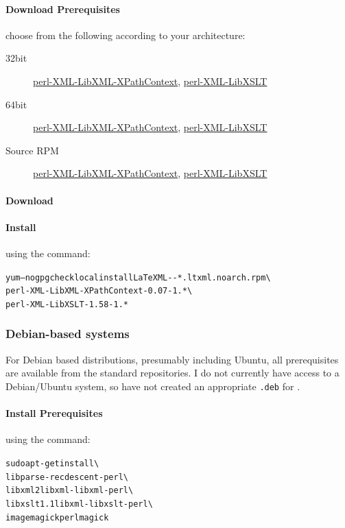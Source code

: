 \documentclass{article}
\begin{document}
\paragraph{Download Prerequisites} choose from the following according to your architecture:
\begin{description}
\item[32bit]
   \href{releases/perl-XML-LibXML-XPathContext-0.07-1.c5.ltxml.i386.rpm}{perl-XML-LibXML-XPathContext},
   \href{releases/perl-XML-LibXSLT-1.58-1.c5.ltxml.i386.rpm}{perl-XML-LibXSLT}
\item[64bit]
   \href{releases/perl-XML-LibXML-XPathContext-0.07-1.c5.ltxml.x86_64.rpm}{perl-XML-LibXML-XPathContext},
   \href{releases/perl-XML-LibXSLT-1.58-1.c5.ltxml.x86_64.rpm}{perl-XML-LibXSLT}
\item[Source RPM]
    \href{releases/perl-XML-LibXML-XPathContext-0.07-1.c5.ltxml.src.rpm}{perl-XML-LibXML-XPathContext},
    \href{releases/perl-XML-LibXSLT-1.58-1.c5.ltxml.src.rpm}{perl-XML-LibXSLT}
\end{description}
\paragraph{Download} \CurrentCentos
\paragraph{Install} using the command:
\begin{alltt}
   yum --nogpgcheck localinstall LaTeXML-\CurrentVersion-*.ltxml.noarch.rpm \textbackslash\\
       perl-XML-LibXML-XPathContext-0.07-1.*   \textbackslash\\
       perl-XML-LibXSLT-1.58-1.*
\end{alltt}

\subsubsection{Debian-based systems}\label{install.debian}
For Debian based distributions, presumably including Ubuntu,
all prerequisites are available from the standard repositories.
I do not currently have access to a Debian/Ubuntu system, so
have not created an appropriate \texttt{.deb} for \LaTeXML.
\paragraph{Install Prerequisites} using the command:
\begin{alltt}
   sudo apt-get install   \textbackslash\\
      libparse-recdescent-perl \textbackslash\\
      libxml2 libxml-libxml-perl \textbackslash\\
      libxslt1.1 libxml-libxslt-perl  \textbackslash\\
      imagemagick perlmagick
\end{alltt}
\end{document}
